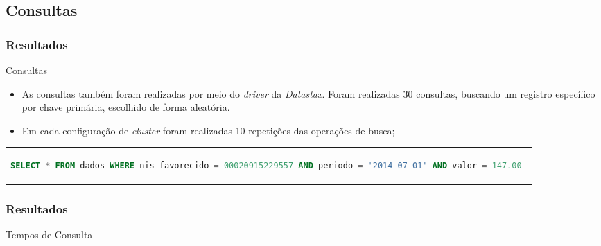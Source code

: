 \documentclass[brazil]{beamer}
\begin{document}
\subsection{Consultas}
\begin{frame}[fragile]
	\frametitle{Resultados}
	\begin{block}{Consultas}
	\begin{itemize}
		\item As consultas também foram realizadas por meio do \emph{driver} da \emph{Datastax}. Foram realizadas 30 consultas, buscando um registro específico por chave primária, escolhido de forma aleatória.
		\item Em cada configuração de \emph{cluster} foram realizadas 10 repetições das operações de busca;	
	\end{itemize}
	
	\begin{tabular}{c}
		\begin{lstlisting}[caption={Código CQL para consulta},language=SQL]
		SELECT * FROM dados WHERE nis_favorecido = 00020915229557 AND periodo = '2014-07-01' AND valor = 147.00 
		\end{lstlisting}
	\end{tabular}
	\end{block}
\end{frame}

\begin{frame}
	\frametitle{Resultados}
	
	\begin{block}{Tempos de Consulta}
	\begin{table}
		\centering
		\caption{Tempos de Consulta}
	\end{table}	
	
	\begin{table}
		\centering
		\caption{Comparativo}
	\end{table}
	\end{block}	
\end{frame}
\end{document}
